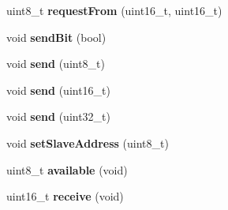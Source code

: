 \begin{DoxyCompactItemize}
\item 
uint8\+\_\+t {\bfseries request\+From} (uint16\+\_\+t, uint16\+\_\+t)\hypertarget{class_modbus_master232_a528931473230921f5f81de4d9bb2e24d}{}\label{class_modbus_master232_a528931473230921f5f81de4d9bb2e24d}

\item 
void {\bfseries send\+Bit} (bool)\hypertarget{class_modbus_master232_a33148cb6ab6b76a65a1ba2f2392674f4}{}\label{class_modbus_master232_a33148cb6ab6b76a65a1ba2f2392674f4}

\item 
void {\bfseries send} (uint8\+\_\+t)\hypertarget{class_modbus_master232_a30c5e9403abee78a392a4a6850a05a16}{}\label{class_modbus_master232_a30c5e9403abee78a392a4a6850a05a16}

\item 
void {\bfseries send} (uint16\+\_\+t)\hypertarget{class_modbus_master232_a0a0f4bcc4db34f0e9d0a0e2364ba1cd4}{}\label{class_modbus_master232_a0a0f4bcc4db34f0e9d0a0e2364ba1cd4}

\item 
void {\bfseries send} (uint32\+\_\+t)\hypertarget{class_modbus_master232_a9572f8d6ba125423a53207e20b366e42}{}\label{class_modbus_master232_a9572f8d6ba125423a53207e20b366e42}

\item 
void {\bfseries set\+Slave\+Address} (uint8\+\_\+t)\hypertarget{class_modbus_master232_ad5198e4ae52b0e85a1d66c55945b8620}{}\label{class_modbus_master232_ad5198e4ae52b0e85a1d66c55945b8620}

\item 
uint8\+\_\+t {\bfseries available} (void)\hypertarget{class_modbus_master232_a809c918d4e5bf11df876ebdee9d655ea}{}\label{class_modbus_master232_a809c918d4e5bf11df876ebdee9d655ea}

\item 
uint16\+\_\+t {\bfseries receive} (void)\hypertarget{class_modbus_master232_ad0476107efe15bd2e37d729f592cdf24}{}\label{class_modbus_master232_ad0476107efe15bd2e37d729f592cdf24}


\end{DoxyCompactItemize}
